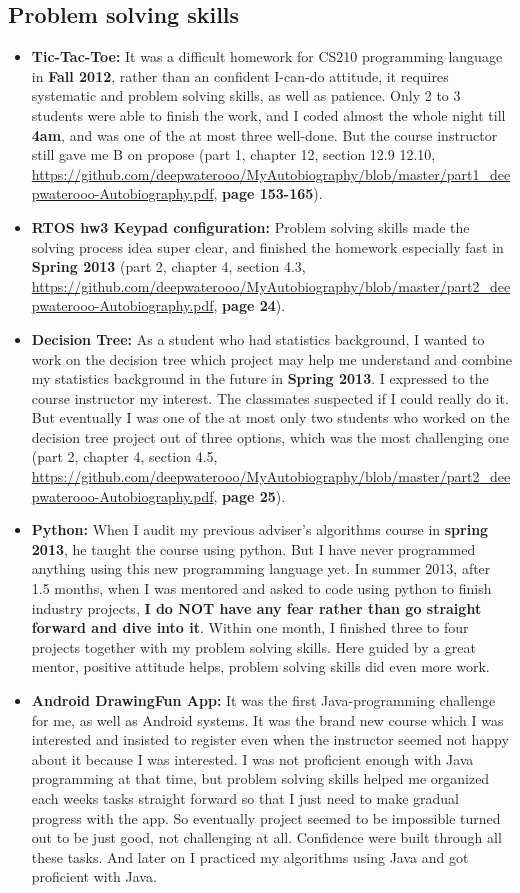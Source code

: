 \documentclass[9pt,b5paper]{article}
\begin{document}
\subsection{Problem solving skills}
\label{sec-10-1}
\begin{itemize}
\item \textbf{Tic-Tac-Toe:} It was a difficult homework for CS210 programming language in \textbf{Fall 2012}, rather than an confident I-can-do attitude, it requires systematic and problem solving skills, as well as patience. Only 2 to 3 students were able to finish the work, and I coded almost the whole night till \textbf{4am}, and was one of the at most three well-done. But the course instructor still gave me B on propose (part 1, chapter 12, section 12.9 12.10, \url{https://github.com/deepwaterooo/MyAutobiography/blob/master/part1_deepwaterooo-Autobiography.pdf}, \textbf{page 153-165}).
\item \textbf{RTOS hw3 Keypad configuration:} Problem solving skills made the solving process idea super clear, and finished the homework especially fast in \textbf{Spring 2013} (part 2, chapter 4, section 4.3, \url{https://github.com/deepwaterooo/MyAutobiography/blob/master/part2_deepwaterooo-Autobiography.pdf}, \textbf{page 24}).
\item \textbf{Decision Tree:} As a student who had statistics background, I wanted to work on the decision tree which project may help me understand and combine my statistics background in the future in \textbf{Spring 2013}. I expressed to the course instructor my interest. The classmates suspected if I could really do it. But eventually I was one of the at most only two students who worked on the decision tree project out of three options, which was the most challenging one (part 2, chapter 4, section 4.5, \url{https://github.com/deepwaterooo/MyAutobiography/blob/master/part2_deepwaterooo-Autobiography.pdf}, \textbf{page 25}).
\item \textbf{Python:} When I audit my previous adviser's algorithms course in \textbf{spring 2013}, he taught the course using python. But I have never programmed anything using this new programming language yet. In summer 2013, after 1.5 months, when I was mentored and asked to code using python to finish industry projects, \textbf{I do NOT have any fear rather than go straight forward and dive into it}. Within one month, I finished three to four projects together with my problem solving skills. Here guided by a great mentor, positive attitude helps, problem solving skills did even more work.
\item \textbf{Android DrawingFun App:} It was the first Java-programming challenge for me, as well as Android systems. It was the brand new course which I was interested and insisted to register even when the instructor seemed not happy about it because I was interested. I was not proficient enough with Java programming at that time, but problem solving skills helped me organized each weeks tasks straight forward so that I just need to make gradual progress with the app. So eventually project seemed to be impossible turned out to be just good, not challenging at all. Confidence were built through all these tasks. And later on I practiced my algorithms using Java and got proficient with Java.
\end{itemize}
\end{document}
